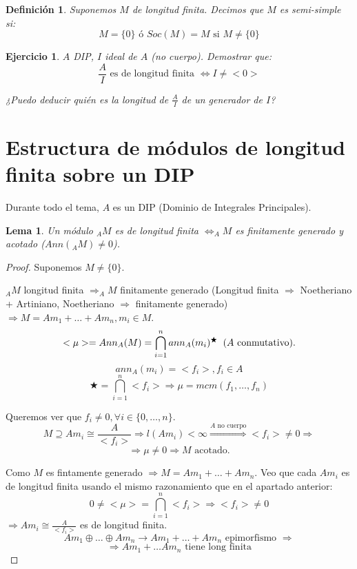 \documentclass[11pt,a4paper]{article}
\newcommand*{\circled}[2][]{\tikz[baseline=(C.base)]{
	\node[inner sep=0pt] (C) {\vphantom{1g}#2};
	\node[draw, circle, inner sep=1pt, yshift=1pt]
		at (C.center) {\vphantom{1g}};}}
\theoremstyle{break}
\newtheorem{lemma}[theorem]{Lema}
\newtheorem{definition}[theorem]{Definición}
\newtheorem{task}[theorem]{Ejercicio}
\begin{document}
\begin{definition}
Suponemos $M$ de longitud finita. Decimos que $M$ es semi-simple si:
$$M = \{0\} \text{ ó } Soc(M) = M \text{ si } M \neq \{0\}$$
\end{definition}

\begin{task}
$A$ DIP, $I$ ideal de $A$ (no cuerpo). Demostrar que:
$$\frac{A}{I} \text{ es de longitud finita }\iff I \neq <0>$$

¿Puedo deducir quién es la longitud de $\frac{A}{I}$ de un generador de $I$?
\end{task}

\newpage

\section{Estructura de módulos de longitud finita sobre un DIP}

Durante todo el tema, $A$ es un DIP (Dominio de Integrales Principales).

\begin{lemma}
Un módulo $_{A}M$ es de longitud finita $\iff _{A}M$ es finitamente generado y acotado ($Ann(_{A}M) \neq 0$).
\end{lemma}

\begin{proof}
Suponemos $M \neq \{0\}$.

\circled{$\Rightarrow$} $_{A}M$ longitud finita $\Rightarrow _{A}M$ finitamente generado (Longitud finita $\Rightarrow$ Noetheriano + Artiniano, Noetheriano $\Rightarrow$ finitamente generado) $\Rightarrow M = Am_{1} + \dots + Am_{n}, m_{i} \in M$.
$$<\mu> = Ann_{A}(M) = \bigcap_{i=1}^{n} ann_{A}(m_{i})^{\bigstar} \hspace{0.2cm} (A \text{ conmutativo}).$$
$$ann_{A}(m_{i}) = <f_{i}>, f_{i} \in A$$
$$\bigstar = \bigcap_{i=1}^{n} <f_{i}> \Rightarrow \mu = mcm(f_{1}, \dots, f_{n})$$

Queremos ver que $f_{i} \neq 0, \forall i \in \{0, \dots, n\}$.
$$M \supseteq Am_{i} \cong \frac{A}{<f_{i}>} \Rightarrow l(Am_{i}) < \infty \overset{A \text{ no cuerpo}}{\Rightarrow} <f_{i}> \neq 0 \Rightarrow$$
$$\Rightarrow \mu \neq 0 \Rightarrow M \text{ acotado.}$$

\circled{$\Leftarrow$} Como $M$ es fintamente generado $\Rightarrow M = Am_{1} + \dots + Am_{n}$. Veo que cada $Am_{i}$ es de longitud finita usando el mismo razonamiento que en el apartado anterior:
$$0 \neq <\mu> = \bigcap_{i=1}^{n}<f_{i}> \Rightarrow <f_{i}> \neq 0$$
$\Rightarrow Am_{i} \cong \frac{A}{<f_{i}>}$ es de longitud finita.
$$Am_{1} \oplus \dots \oplus Am_{n} \rightarrow Am_{1} + \dots + Am_{n} \text{ epimorfismo } \Rightarrow$$
$$\Rightarrow Am_{1} + \dots Am_{n} \text{ tiene long finita}$$
\end{proof}
\end{document}
